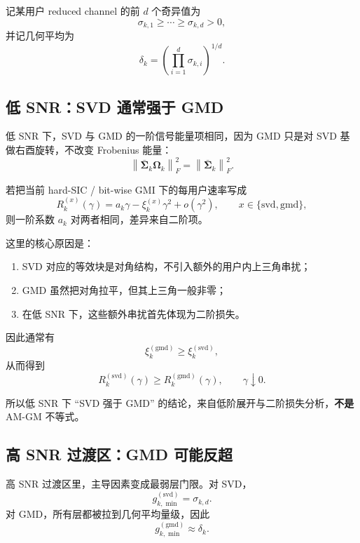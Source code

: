 \documentclass[11pt]{ctexart}
\begin{document}
记某用户 reduced channel 的前 $d$ 个奇异值为
\begin{equation}
    \sigma_{k,1}\ge\cdots\ge\sigma_{k,d}>0,
\end{equation}
并记几何平均为
\begin{equation}
    \delta_k
    =
    \left(
        \prod_{i=1}^{d}\sigma_{k,i}
    \right)^{1/d}.
\end{equation}

\subsection{低 SNR：SVD 通常强于 GMD}
低 SNR 下，SVD 与 GMD 的一阶信号能量项相同，因为 GMD 只是对 SVD 基做右酉旋转，不改变 Frobenius 能量：
\begin{equation}
    \left\|
        \bar{\bm{\Sigma}}_k\bm{\Omega}_k
    \right\|_F^2
    =
    \left\|
        \bar{\bm{\Sigma}}_k
    \right\|_F^2.
\end{equation}

若把当前 hard-SIC / bit-wise GMI 下的每用户速率写成
\begin{equation}
    R_k^{(x)}(\gamma)
    =
    a_k\gamma
    -
    \xi_k^{(x)}\gamma^2
    +
    o(\gamma^2),
    \qquad
    x\in\{\mathrm{svd},\mathrm{gmd}\},
\end{equation}
则一阶系数 $a_k$ 对两者相同，差异来自二阶项。

这里的核心原因是：
\begin{enumerate}
    \item SVD 对应的等效块是对角结构，不引入额外的用户内上三角串扰；
    \item GMD 虽然把对角拉平，但其上三角一般非零；
    \item 在低 SNR 下，这些额外串扰首先体现为二阶损失。
\end{enumerate}

因此通常有
\begin{equation}
    \xi_k^{(\mathrm{gmd})}
    \ge
    \xi_k^{(\mathrm{svd})},
\end{equation}
从而得到
\begin{equation}
    R_k^{(\mathrm{svd})}(\gamma)
    \ge
    R_k^{(\mathrm{gmd})}(\gamma),
    \qquad
    \gamma\downarrow 0.
\end{equation}

所以低 SNR 下 ``SVD 强于 GMD'' 的结论，来自低阶展开与二阶损失分析，\textbf{不是} AM-GM 不等式。

\subsection{高 SNR 过渡区：GMD 可能反超}
高 SNR 过渡区里，主导因素变成最弱层门限。对 SVD，
\begin{equation}
    g_{k,\min}^{(\mathrm{svd})}
    =
    \sigma_{k,d}.
\end{equation}
对 GMD，所有层都被拉到几何平均量级，因此
\begin{equation}
    g_{k,\min}^{(\mathrm{gmd})}
    \approx
    \delta_k.
\end{equation}
\end{document}

